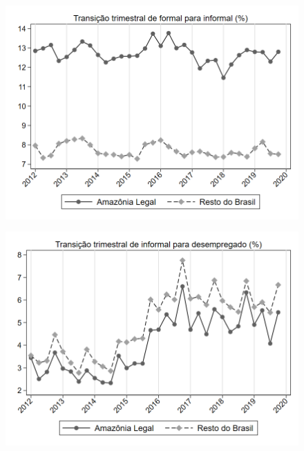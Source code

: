 \begin{frame}[label=_transicao_ocupacao_sh_formal_sh_informal]{}
\textit{\hyperlink{_transicao_ocupacao}{}}
\begin{figure}
  \centering
  \includegraphics[width=1.0\linewidth]{../../analysis/output/transicao_ocupacao/_transicao_ocupacao_sh_formal_sh_informal.png}
  \caption{}
  \label{fig:_transicao_ocupacao_sh_formal_sh_informal}
\end{figure}
\end{frame}

\begin{frame}[label=_transicao_ocupacao_sh_informal_sh_desempregado]{}
\textit{\hyperlink{_transicao_ocupacao}{}}
\begin{figure}
  \centering
  \includegraphics[width=1.0\linewidth]{../../analysis/output/transicao_ocupacao/_transicao_ocupacao_sh_informal_sh_desempregado.png}
  \caption{}
  \label{fig:_transicao_ocupacao_sh_informal_sh_desempregado}
\end{figure}
\end{frame}



